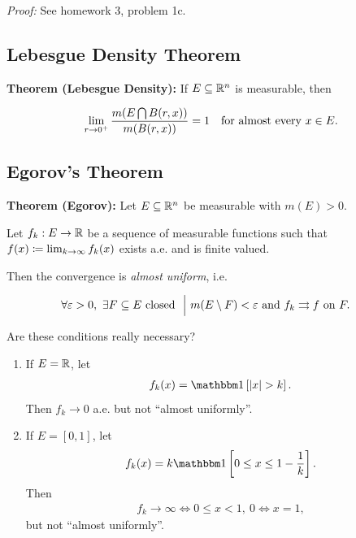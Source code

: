\emph{Proof:} See homework 3, problem 1c.

\hypertarget{lebesgue-density-theorem}{%
\subsection{Lebesgue Density Theorem}\label{lebesgue-density-theorem}}

\textbf{Theorem (Lebesgue Density):} If \(E\subseteq {\mathbb{R}}^n\) is
measurable, then

\begin{align*}
\lim_{r\to 0^+} \frac{m(E \bigcap  B(r, x))}{m(B(r, x))} = 1 \quad  \text{for almost every } x \in E. 
\end{align*}

\hypertarget{egorovs-theorem}{%
\subsection{Egorov's Theorem}\label{egorovs-theorem}}

\textbf{Theorem (Egorov):} Let \(E \subseteq {\mathbb{R}}^n\) be measurable with
\(m(E) > 0\).

Let \(f_k: E \to {\mathbb{R}}\) be a sequence of measurable functions such that
\(f(x) \coloneqq \lim_{k\to\infty} f_k(x)\) exists a.e. and is finite
valued.

Then the convergence is \emph{almost uniform}, i.e.

\begin{align*}
\forall\varepsilon > 0, ~\exists F \subseteq E ~\text{closed}~ {~\mathrel{\Big|}~} & 
m(E\setminus F) < \varepsilon ~\text{and}~ f_k \rightrightarrows  f ~\text{on}~ F
.\end{align*}

Are these conditions really necessary?

\begin{enumerate}
\def\labelenumi{\arabic{enumi}.}
\item
  If \(E = {\mathbb{R}}\), let
  \begin{align*}
  f_k(x)  = \indic{\abs x > k}
  .\end{align*} Then \(f_k \to 0\) a.e. but not ``almost uniformly''.
\item
  If \(E = [0, 1]\), let
  \begin{align*}
  f_k(x) = k\indic{0 \leq x \leq 1 - \frac 1 k}
  .\end{align*} Then
  \begin{align*}
  f_k \to \infty \iff 0 \leq x < 1,~ 0 \iff x = 1,\end{align*} but not
  ``almost uniformly''.
\end{enumerate}

